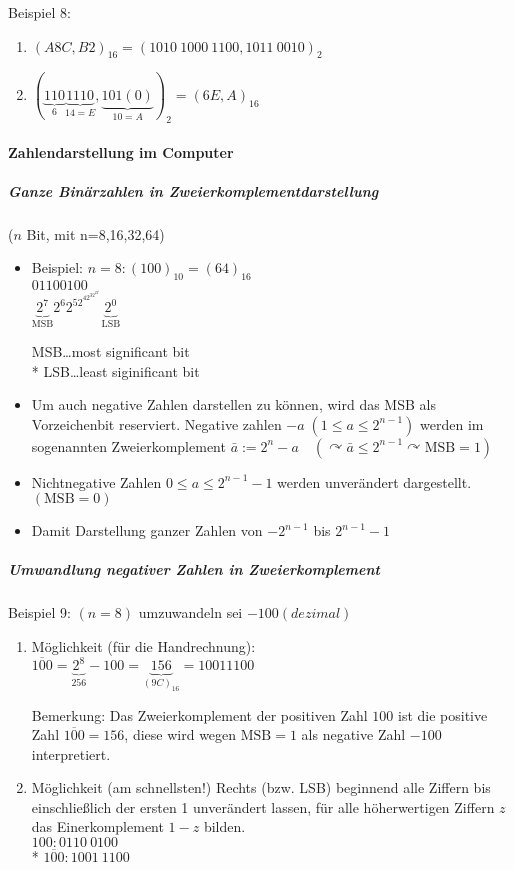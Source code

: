 \documentclass[a4paper]{scrartcl}
\begin{document}
Beispiel 8:
\begin {enumerate}
\item $(A8C,B2)_{16} = (1010\: 1000\: 1100, 1011\: 0010)_2$
\item $(\underbrace{110}_{6} \underbrace{1110}_{14=E},\underbrace{101(0)}_{10=A})_2 = (6E,A)_{16}$
\end {enumerate}

\paragraph{Zahlendarstellung im Computer}

\subparagraph{Ganze Binärzahlen in Zweierkomplementdarstellung}
($n$ Bit, mit n=8,16,32,64)

\begin{itemize}
\item Beispiel: $n=8 : (100)_{10} = (64)_{16}$\\
$01100100$\\
$\underbrace{2^7}_{\text{MSB}} 2^6 2^52^42^32^22^1\underbrace{2^0}_{\text{LSB}}$


MSB\dots most significant bit\\*
LSB\dots least siginificant bit
\item Um auch negative Zahlen darstellen zu können, wird das MSB als Vorzeichenbit reserviert. Negative zahlen $-a \; (1\leq a \leq 2^{n-1})$ werden im sogenannten Zweierkomplement $\bar{a} := 2^n -a \quad (\curvearrowright \bar{a} \leq 2^{n-1} \curvearrowright \text{MSB}=1)$
\item Nichtnegative Zahlen $0\leq a \leq 2^{n-1} -1$ werden unverändert dargestellt. $(\text{MSB}=0)$
\item Damit Darstellung ganzer Zahlen von $-2^{n-1}$ bis $2^{n-1} -1$
\end{itemize}

\subparagraph{Umwandlung negativer Zahlen in Zweierkomplement}
Beispiel 9: $(n=8)$ umzuwandeln sei $-100 (dezimal)$

\begin{enumerate}
\item Möglichkeit (für die Handrechnung):\\
$\overline{100} = \underbrace{2^8}_{256} - 100 = \underbrace{156}_{(9C)_{16}} = 10011100$%

Bemerkung: Das Zweierkomplement der positiven Zahl $100$ ist die positive Zahl $\overline{100}=156$, diese wird wegen $\text{MSB}=1$ als negative Zahl $-100$ interpretiert.
\item Möglichkeit (am schnellsten!)
Rechts (bzw. LSB) beginnend alle Ziffern bis einschließlich der ersten 1 unverändert lassen, für alle höherwertigen Ziffern $z$ das Einerkomplement $1-z$ bilden.\\
$100:0110 \: 0100$\\*
$\overline{100}: 1001\:1100$
\end{enumerate}
\end{document}
